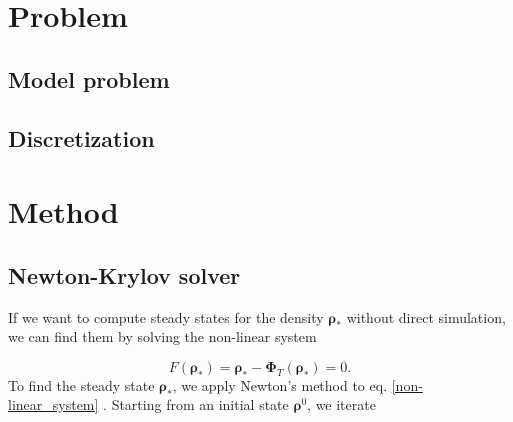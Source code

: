 \documentclass[]{article}
\newcommand{\R}{\ensuremath{\mathbb{R}}} %
\newcommand{\U}{\ensuremath{\boldsymbol{\rho}}}
\newcommand{\cts}{\ensuremath{\boldsymbol{\Phi}_T}} %
\begin{document}
\begin{abstract}


\end{abstract}

\section{Problem}

\subsection{Model problem}



\subsection{Discretization}


\section{Method}

\subsection{Newton-Krylov solver} \label{sec:Newton-Krylov}


If we want to compute steady states for the density $\U_*$ without direct simulation, we can find them by solving the non-linear system

\begin{equation}
  {F}(\U_*) = \U_* - \cts(\U_*) =0. \label{non-linear_system}
\end{equation}
To find the steady state $\U_*$, we apply Newton's method to eq. \ref{non-linear_system} . Starting from an initial state $\U^0$, we iterate 
\end{document}

